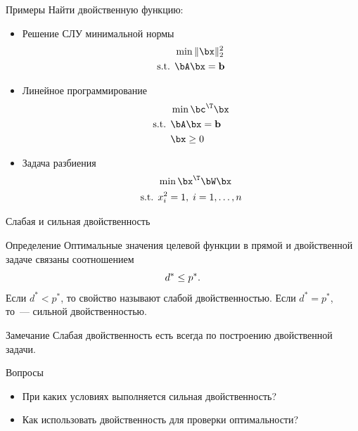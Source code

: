 \documentclass[12pt]{beamer}
\begin{document}
\begin{frame}{Примеры}
Найти двойственную функцию:
\begin{itemize}
\item Решение СЛУ минимальной нормы 
\vspace{-3mm}
\begin{equation*}
\begin{split}
& \min \| \bx\|^2_2\\
\text{s.t. } & \bA\bx = \mathbf{b}
\end{split}
\end{equation*}
\item Линейное программирование
\vspace{-3mm}
\begin{equation*}
\begin{split}
& \min \bc^{\T}\bx\\
\text{s.t. } & \bA\bx = \mathbf{b}\\
& \bx \geq 0
\end{split}
\end{equation*}
\item Задача разбиения
\vspace{-3mm}
\begin{equation*}
\begin{split}
& \min \bx^{\T}\bW\bx\\
\text{s.t. } & x^2_i = 1, \; i = 1,\ldots,n
\end{split}
\end{equation*}
\end{itemize}
\end{frame}

\begin{frame}{Слабая и сильная двойственность}
\small
\begin{block}{Определение}
Оптимальные значения целевой функции в прямой и двойственной задаче связаны соотношением 
\vspace{-3mm}
\[
d^* \leq p^*.
\vspace{-4mm}
\]
Если $d^* < p^*$, то свойство называют слабой двойственностью.
Если $d^* = p^*$, то~--- сильной двойственностью.
\end{block}

\begin{block}{Замечание}
Слабая двойственность есть всегда по построению двойственной задачи.
\end{block}

\begin{block}{Вопросы}
\begin{itemize}
\item При каких условиях выполняется сильная двойственность?
\vspace{-7mm}
\item Как использовать двойственность для проверки оптимальности?
\end{itemize}
\end{block}
\end{frame}
\end{document}
